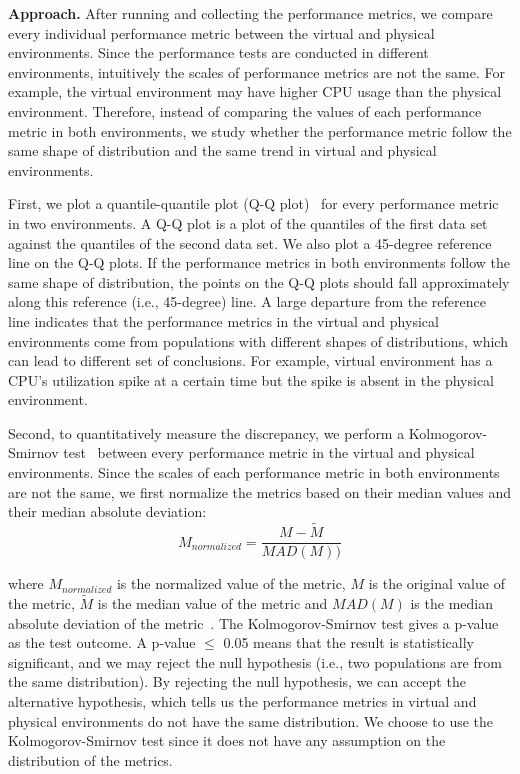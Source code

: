 \documentclass[smallextended]{svjour3}       %
\begin{document}
\noindent \textbf{Approach.} 
After running and collecting the performance metrics, we compare every individual performance metric between the virtual and physical environments. Since the performance tests are conducted in different environments, intuitively the scales of performance metrics are not the same. For example, the virtual environment may have higher CPU usage than the physical environment. Therefore, instead of comparing the values of each performance metric in both environments, we study whether the performance metric follow the same shape of distribution and the same trend in virtual and physical environments. 

First, we plot a quantile-quantile plot (Q-Q plot)~\cite{qqplots} for every performance metric in two environments. A Q-Q plot is a plot of the quantiles of the first data set against the quantiles of the second data set. We also plot a 45-degree reference line on the Q-Q plots. If the performance metrics in both environments follow the same shape of distribution, the points on the Q-Q plots should fall approximately along this reference (i.e., 45-degree) line. A large departure from the reference line indicates that the performance metrics in the virtual and physical environments come from populations with different shapes of distributions, which can lead to different set of conclusions. For example, virtual environment has a CPU's utilization spike at a certain time but the spike is absent in the physical environment. 

Second, to quantitatively measure the discrepancy, we perform a Kolmogorov-Smirnov test~\cite{kstest} between every performance metric in the virtual and physical environments. Since the scales of each performance metric in both environments are not the same, we first normalize the metrics based on their median values and their median absolute deviation: 
\begin{equation}
\label{equ:mad}
M_{normalized}=\frac{M-\tilde{M}}{MAD(M))}		
\end{equation}

where $M_{normalized}$ is the normalized value of the metric, $M$ is the original value of the metric, $\tilde{M}$ is the median value of the metric and $MAD(M)$ is the median absolute deviation of the metric~\cite{walker1929studies}. The Kolmogorov-Smirnov test gives a p-value as the test outcome. A p-value $\leq$ 0.05 means that the result is statistically significant, and we may reject the null hypothesis (i.e., two populations are from the same distribution). By rejecting the null hypothesis, we can accept the alternative hypothesis, which tells us the performance metrics in virtual and physical environments do not have the same distribution. We choose to use the Kolmogorov-Smirnov test since it does not have any assumption on the distribution of the metrics.
\end{document}
